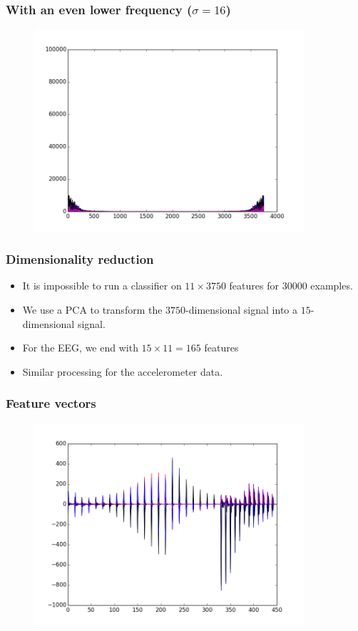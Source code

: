 \documentclass{beamer}
\begin{document}
\begin{frame}
	\frametitle{With an even lower frequency ($\sigma=16$)}
	\begin{figure}
		\centering
		\includegraphics[width=10cm]{../__sig1_eeg_2.png}
	\end{figure}
\end{frame}

\begin{frame}
	\frametitle{Dimensionality reduction}
	\begin{itemize}
		\item It is impossible to run a classifier on $11\times3750$ features for $30000$ examples.
		\item We use a PCA to transform the $3750$-dimensional signal into a $15$-dimensional signal.
		\item For the EEG, we end with $15\times11=165$ features
		\item Similar processing for the accelerometer data.
	\end{itemize}
\end{frame}

\begin{frame}
	\frametitle{Feature vectors}
	\begin{figure}
		\centering
		\includegraphics[width=10cm]{../model50/__features.png}
	\end{figure}
\end{frame}
\end{document}
